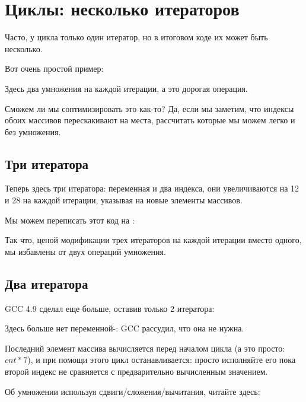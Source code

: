 ﻿\section{Циклы: несколько итераторов}
\label{loop_iterators}

Часто, у цикла только один итератор, но в итоговом коде их может быть несколько.

Вот очень простой пример:



Здесь два умножения на каждой итерации, а это дорогая операция.

Сможем ли мы соптимизировать это как-то?
Да, если мы заметим, что индексы обоих массивов перескакивают на места, рассчитать которые мы
можем легко и без умножения.

\subsection{Три итератора}



Теперь здесь три итератора: переменная  и два индекса, они увеличиваются на 12 и 28 на каждой
итерации, указывая на новые элементы массивов.

Мы можем переписать этот код на \CCpp:



Так что, ценой модификации трех итераторов на каждой итерации вместо одного, 
мы избавлены от двух операций умножения.

\subsection{Два итератора}

GCC 4.9 сделал еще больше, оставив только 2 итератора:



Здесь больше нет переменной-: GCC рассудил, что она не нужна.

Последний элемент массива  вычисляется перед началом цикла (а это просто: $cnt*7$),
и при помощи этого цикл останавливается: просто исполняйте его пока второй индекс не сравняется
с предварительно вычисленным значением.

Об умножении используя сдвиги/сложения/вычитания, читайте здесь:
 
